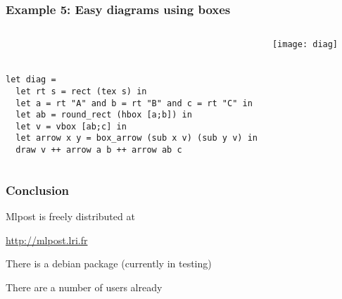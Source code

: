 \documentclass[nodefaultblocks]{beamer}
\begin{document}
\begin{frame}[fragile]
\frametitle{Example 5: Easy diagrams using boxes}
\begin{columns}
\small
\begin{verbatim}



let diag =
  let rt s = rect (tex s) in
  let a = rt "A" and b = rt "B" and c = rt "C" in
  let ab = round_rect (hbox [a;b]) in
  let v = vbox [ab;c] in
  let arrow x y = box_arrow (sub x v) (sub y v) in
  draw v ++ arrow a b ++ arrow ab c 
\end{verbatim}
\texttt{[image: diag]}
\end{columns}

\end{frame}

\begin{frame}\frametitle{Conclusion}

Mlpost is freely distributed at

\begin{center}
  \url{http://mlpost.lri.fr}
\end{center}

There is a debian package (currently in testing)

There are a number of users already

\end{frame}
\end{document}
